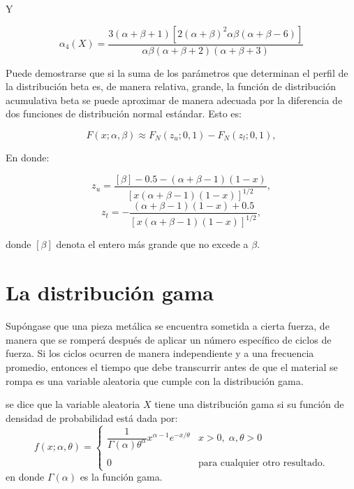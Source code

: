 Y

\begin{tcolorbox}
    $$\alpha_4(X)=\dfrac{3(\alpha+\beta+1)\left[2(\alpha+\beta)^2\alpha\beta (\alpha+\beta - 6)\right]}{\alpha\beta (\alpha+\beta + 2)(\alpha +\beta + 3)}$$
\end{tcolorbox}

Puede demostrarse que si la suma de los parámetros que determinan el perfil de la distribución beta es, de manera relativa, grande, la función de distribución acumulativa beta se puede aproximar de manera adecuada por la diferencia de dos funciones de distribución normal estándar. Esto es:

$$F(x;\alpha, \beta) \approx F_N(z_u;0,1)-F_N(z_l; 0,1),$$

En donde:

$$z_u=\dfrac{[\beta] - 0.5 - (\alpha+\beta-1)(1-x)}{\left[x(\alpha+\beta - 1)(1-x)\right]^{1/2}},$$
$$z_t=-\dfrac{(\alpha+\beta-1)(1-x)+0.5}{\left[x(\alpha+\beta - 1)(1-x)\right]^{1/2}},$$

donde $[\beta]$ denota el entero más grande que no excede a $\beta$.


\section{La distribución gama}

Supóngase que una pieza metálica se encuentra sometida a cierta fuerza, de manera que se romperá después de aplicar un número específico de ciclos de fuerza. Si los ciclos ocurren de manera independiente y a una frecuencia promedio, entonces el tiempo que debe transcurrir antes de que el material se rompa es una variable aleatoria que cumple con la distribución gama.

\begin{tcolorbox}
    \begin{def.}
	se dice que la variable aleatoria $X$ tiene una distribución gama si su función de densidad de probabilidad está dada por:
	$$f(x;\alpha,\theta)=\left\{\begin{array}{ll}
		\dfrac{1}{\Gamma(\alpha)\theta^\alpha}x^{\alpha-1}e^{-x/\theta} & x>0,\; \alpha,\theta>0\\\\
		0 & \mbox{para cualquier otro resultado.}
	\end{array}\right.$$
	en donde $\Gamma(\alpha)$ es la función gama.\\\\
    \end{def.}
\end{tcolorbox}


